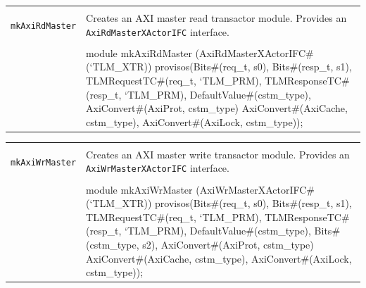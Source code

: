 \documentclass[twoside,letterpaper]{article}
\newcommand{\te}[1]{\texttt{#1}}
\newenvironment{libverbatim}
  {\vspace*{-1.0em}
   \verbatim}
  {\endverbatim
  }
\begin{document}

\begin{center}
\begin{tabular}{|p{1 in}|p{5.2 in}|}
\hline 
&\\
\te{mkAxiRdMaster}&Creates an AXI master read transactor module. Provides an \te{AxiRdMasterXActorIFC} interface.  \\
&\\
\cline{2-2}
&\begin{libverbatim}
module mkAxiRdMaster (AxiRdMasterXActorIFC#(`TLM_XTR))
   provisos(Bits#(req_t, s0), 
            Bits#(resp_t, s1),
            TLMRequestTC#(req_t, `TLM_PRM),
            TLMResponseTC#(resp_t, `TLM_PRM),
            DefaultValue#(cstm_type),
            AxiConvert#(AxiProt, cstm_type)
            AxiConvert#(AxiCache, cstm_type),
            AxiConvert#(AxiLock, cstm_type));
\end{libverbatim}
\\
\hline
\end{tabular}
\end{center}



\begin{center}
\begin{tabular}{|p{1 in}|p{5.2 in}|}
\hline 
&\\
\te{mkAxiWrMaster}&Creates an AXI master write transactor module. Provides an \te{AxiWrMasterXActorIFC} interface.  \\
&\\
\cline{2-2}
&\begin{libverbatim}
module mkAxiWrMaster (AxiWrMasterXActorIFC#(`TLM_XTR))
   provisos(Bits#(req_t, s0), 
            Bits#(resp_t, s1),
            TLMRequestTC#(req_t, `TLM_PRM),
            TLMResponseTC#(resp_t, `TLM_PRM),
            DefaultValue#(cstm_type),
            Bits#(cstm_type, s2),
            AxiConvert#(AxiProt, cstm_type)
            AxiConvert#(AxiCache, cstm_type),
            AxiConvert#(AxiLock, cstm_type));
\end{libverbatim}
\\
\hline
\end{tabular}
\end{center}

\end{document}
